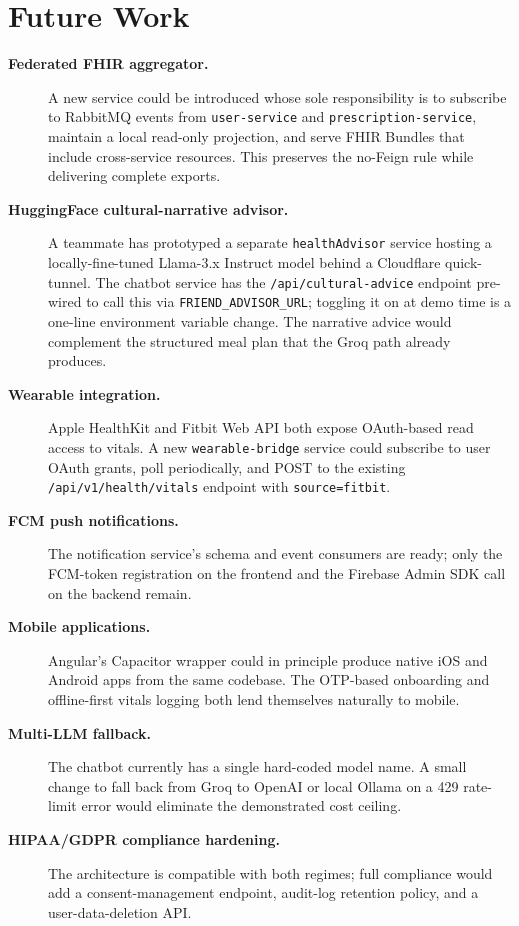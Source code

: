 \documentclass[12pt]{caltech_thesis}
\begin{document}
\section{Future Work}
\label{sec:future-fhir}

\begin{description}
    \item[\textbf{Federated FHIR aggregator.}] A new service could be
    introduced whose sole responsibility is to subscribe to RabbitMQ
    events from \texttt{user-service} and \texttt{prescription-service},
    maintain a local read-only projection, and serve FHIR Bundles that
    include cross-service resources. This preserves the no-Feign rule
    while delivering complete exports.
    \item[\textbf{HuggingFace cultural-narrative advisor.}] A teammate
    has prototyped a separate \texttt{healthAdvisor} service hosting a
    locally-fine-tuned Llama-3.x Instruct model behind a Cloudflare
    quick-tunnel. The chatbot service has the
    \texttt{/api/cultural-advice} endpoint pre-wired to call this via
    \texttt{FRIEND\_ADVISOR\_URL}; toggling it on at demo time is a
    one-line environment variable change. The narrative advice would
    complement the structured meal plan that the Groq path already
    produces.
    \item[\textbf{Wearable integration.}] Apple HealthKit and Fitbit
    Web API both expose OAuth-based read access to vitals. A new
    \texttt{wearable-bridge} service could subscribe to user OAuth
    grants, poll periodically, and POST to the existing
    \texttt{/api/v1/health/vitals} endpoint with
    \texttt{source=fitbit}.
    \item[\textbf{FCM push notifications.}] The notification service's
    schema and event consumers are ready; only the FCM-token
    registration on the frontend and the Firebase Admin SDK call on
    the backend remain.
    \item[\textbf{Mobile applications.}] Angular's Capacitor wrapper
    could in principle produce native iOS and Android apps from the
    same codebase. The OTP-based onboarding and offline-first vitals
    logging both lend themselves naturally to mobile.
    \item[\textbf{Multi-LLM fallback.}] The chatbot currently has a
    single hard-coded model name. A small change to fall back from
    Groq to OpenAI or local Ollama on a 429 rate-limit error would
    eliminate the demonstrated cost ceiling.
    \item[\textbf{HIPAA/GDPR compliance hardening.}] The architecture
    is compatible with both regimes; full compliance would add a
    consent-management endpoint, audit-log retention policy, and a
    user-data-deletion API.
\end{description}
\end{document}
